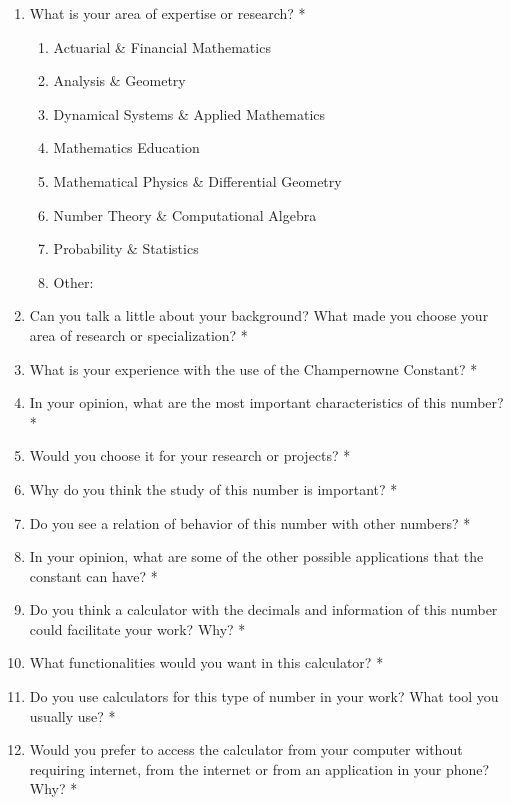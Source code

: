 \documentclass{report}
\begin{document}
\begin{enumerate}
\item{What is your area of expertise or research?\color{red} *}
    \begin{enumerate}
    \item Actuarial \& Financial Mathematics
    \item Analysis \& Geometry
    \item Dynamical Systems \& Applied Mathematics
    \item Mathematics Education
    \item Mathematical Physics \& Differential Geometry
    \item Number Theory \& Computational Algebra
    \item Probability \& Statistics
    \item Other: 
    \end{enumerate}

\item{Can you talk a little about your background? What made you choose your area of research or specialization?\color{red} *}
\item{What is your experience with the use of the Champernowne Constant? \color{red} *}
\item{In your opinion, what are the most important characteristics of this number? \color{red} *}
\item{Would you choose it for your research or projects?\color{red} *}
\item{Why do you think the study of this number is important?\color{red} *}
\item{Do you see a relation of behavior of this number with other numbers?\color{red} *}
\item{In your opinion, what are some of the other possible applications that the constant can have?\color{red} *}
\item{Do you think a calculator with the decimals and information of this number could facilitate your work? Why?\color{red} *}
\item{What functionalities would you want in this calculator?\color{red} *}
\item{Do you use calculators for this type of number in your work? What tool you usually use?\color{red} *}
\item{Would you prefer to access the calculator from your computer without requiring internet, from the internet or from an application in your phone? Why?\color{red} *}
\end{enumerate}
\end{document}
